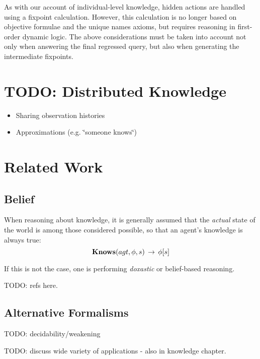 As with our account of individual-level knowledge, hidden actions
are handled using a fixpoint calculation. However, this calculation
is no longer based on objective formulae and the unique names axioms,
but requires reasoning in first-order dynamic logic. The above considerations
must be taken into account not only when answering the final regressed
query, but also when generating the intermediate fixpoints.


\section{TODO: Distributed Knowledge}

\begin{itemize}
\item Sharing observation histories 
\item Approximations (e.g. \char`\"{}someone knows\char`\"{}) 
\end{itemize}

\section{Related Work}


\subsection{Belief}

When reasoning about knowledge, it is generally assumed that the \emph{actual}
state of the world is among those considered possible, so that an
agent's knowledge is always true:\[
\mathbf{Knows}(agt,\phi,s)\,\rightarrow\,\phi[s]\]


If this is not the case, one is performing \emph{doxastic} or belief-based
reasoning.

TODO: refs here.


\subsection{Alternative Formalisms}

TODO: decidability/weakening \citep{demolombe00tractable_sc_belief}
\citep{petrick02knowledge_equivalence}

TODO: discuss wide variety of applications - also in knowledge chapter.


